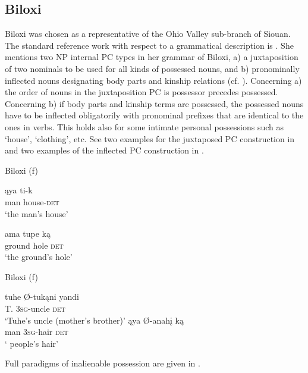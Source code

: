 \documentclass[output=paper]{LSP/langsci}
\begin{document}
\subsection{Biloxi}\label{sec:helmbrecht:4.6}
Biloxi was chosen as a representative of the Ohio Valley sub-branch of Siouan. The standard reference work with respect to a grammatical description is \citet{Einaudi1976}. She mentions two NP internal PC types in her grammar of Biloxi, a) a juxtaposition of two nominals to be used for all kinds of possessed nouns, and b) pronominally inflected nouns designating body parts and kinship relations (cf. \citealt[57-68]{Einaudi1976}). Concerning a) the order of nouns in the juxtaposition PC is possessor precedes possessed. Concerning b) if body parts and kinship terms are possessed, the possessed nouns have to be inflected obligatorily with pronominal prefixes that are identical to the ones in verbs. This holds also for some intimate personal possessions such as `house', `clothing', etc. See two examples for the juxtaposed PC construction in  and two examples of the inflected PC construction in .

\ea Biloxi (\citealt[139]{Einaudi1976}f) \label{biloxihouse}

\ea
\gll \k{a}ya   ti-k		\\				
man house-\textsc{det} \\
\glt `the man's house'

\ex 
\gll ama tupe k\k{a} \\
ground hole \textsc{det} \\
\glt `the ground's hole'
\z \z

\ea	Biloxi (\citealt[139]{Einaudi1976}f) \label{biloxiuncle}

\ea \gll tuhe   Ø-tukąni       yandi	\\  
T.      \textsc{3sg}-uncle    \textsc{det} \\
\glt `Tuhe's uncle (mother's brother)'
\ex \gll ąya   Ø-anahį    k\k{a} \\
man \textsc{3sg}-hair   \textsc{det} \\
\glt `	people's hair'
\z \z

Full paradigms of inalienable possession are given in .
\end{document}
